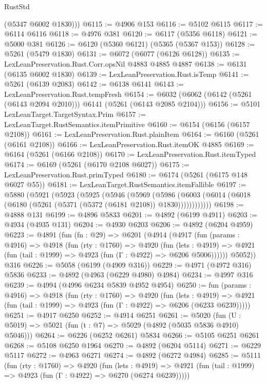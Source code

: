 \begin{lexlean}{RustStd}
\begin{coremodule}
        (@5347 @6002 @1830)))
@6115 := @4906 @153
@6116 := @5102 @6115
@6117 := @6114 @6116
@6118 := @4976 @381
@6120 := @6117 (@5356 @6118)
@6121 := @5000 @381
@6126 := @6120 (@5360 @6121) (@5365 (@5367 @153))
@6128 := @5261 (@5479 @1830)
@6131 := @6072 (@6077 (@6126 @6128))
@6135 := LexLeanPreservation.Rust.Corr.opsNil @4883 @4885 @4887
@6138 := @6131 (@6135 @6002 @1830)
@6139 := LexLeanPreservation.Rust.isTemp
@6141 := @5261 (@6139 @2083)
@6142 := @6138 @6141
@6143 := LexLeanPreservation.Rust.tempFresh
@6154 := @6032 (@6062 (@6142 (@5261 (@6143 @2094 @2010))) @6141 (@5261 (@6143 @2085 @2104)))
@6156 := @5101 LexLeanTarget.TargetSyntax.Prim
@6157 := LexLeanTarget.RustSemantics.itemPrimitive
@6160 := @6154 (@6156 (@6157 @2108))
@6161 := LexLeanPreservation.Rust.plainItem
@6164 := @6160 (@5261 (@6161 @2108))
@6166 := LexLeanPreservation.Rust.itemOK @4885
@6169 := @6164 (@5261 (@6166 @2108))
@6170 := LexLeanPreservation.Rust.itemTyped
@6174 := @6169 (@5261 (@6170 @2108 @6027))
@6175 := LexLeanPreservation.Rust.primTyped
@6180 := @6174 (@5261 (@6175 @148 @6027 @55))
@6181 := LexLeanTarget.RustSemantics.itemFallible
@6197 := @5880
    (@5921
      (@5923
        (@5925
          (@5946
            (@5969
              (@5986
                (@6003 (@6014 (@6018 (@6180 (@5261 (@5371 (@5372 (@6181 @2108)) @1830))))))))))))
@6198 := @4888 @131
@6199 := @4896 @5833
@6201 := @4892 (@6199 @4911)
@6203 := @4934 (@4935 @131)
@6204 := @4930 @6203
@6206 := @4892 (@6204 @4959)
@6223 := @4891
    (fun (fn : @29) =>
    @6201
      (@4914
        (@4917
          (fun (params : @4916) =>
          @4918
            (fun (rty : @1760) =>
            @4920
              (fun (lets : @4919) =>
              @4921 (fun (tail : @1999) => @4923 (fun (Γ : @4922) => @6206 @5006))))))
        @5052))
    @316
@6226 := @5058 (@6199 (@4909 @316))
@6229 := @4971 (@4972 @316) @5836
@6233 := @4892 (@4963 (@6229 @4980) @4984)
@6234 := @4997 @316
@6239 := @4994 (@4996 @6234 @5839 @4952 @4954)
@6250 := fun (params : @4916) =>
  @4918
    (fun (rty : @1760) =>
    @4920
      (fun (lets : @4919) =>
      @4921 (fun (tail : @1999) => @4923 (fun (Γ : @4922) => @6206 (@6233 @6239)))))
@6251 := @4917 @6250
@6252 := @4914 @6251
@6261 := @5020 (fun (U : @5019) => @5021 (fun (t : @7) => @5029 (@4892 (@5035 @5836 @4910) @5046)))
@6264 := @6226 (@6252 @6261) @5834
@6266 := @5105 @6251 @6261
@6268 := @5108 @6250 @1964
@6270 := @4892 (@6204 @5114)
@6271 := @6229 @5117
@6272 := @4963 @6271
@6274 := @4892 (@6272 @4984)
@6285 := @5111
    (fun (rty : @1760) =>
    @4920
      (fun (lets : @4919) =>
      @4921 (fun (tail : @1999) => @4923 (fun (Γ : @4922) => @6270 (@6274 @6239)))))

\end{coremodule}
\end{lexlean}
